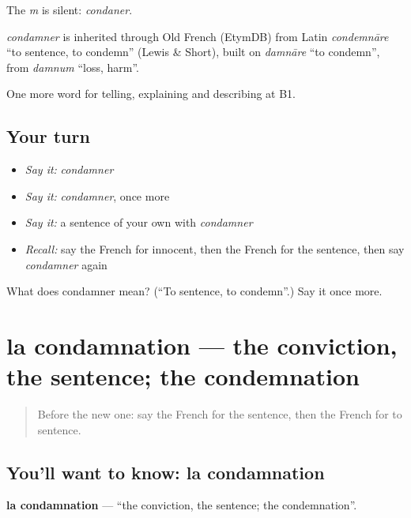 The \emph{m} is silent: \emph{condaner}.

\begin{cousinweb}
\emph{condamner} is inherited through Old French (EtymDB) from Latin \emph{condemnāre} \textquotedblleft{}to sentence, to condemn\textquotedblright{} (Lewis \& Short), built on \emph{damnāre} \textquotedblleft{}to condemn\textquotedblright{}, from \emph{damnum} \textquotedblleft{}loss, harm\textquotedblright{}.
\end{cousinweb}

\begin{grammarlens}[title={What you've built}]
One more word for telling, explaining and describing at B1.
\end{grammarlens}

\subsection*{Your turn}
\begin{itemize}
\raggedright
  \item \emph{Say it:} \emph{condamner}
  \item \emph{Say it:} \emph{condamner}, once more
  \item \emph{Say it:} a sentence of your own with \emph{condamner}
  \item \emph{Recall:} say the French for innocent, then the French for the sentence, then say \emph{condamner} again
\end{itemize}

\begin{tcolorbox}[breakable,colback=teal!4,colframe=teal!35!black,title={Before you move on}]
What does condamner mean? (\textquotedblleft{}To sentence, to condemn\textquotedblright{}.) Say it once more.
\end{tcolorbox}
\section[la condamnation]{la condamnation — the conviction, the sentence; the condemnation}

\label{lesson:FR-C388-condamnation}



\begin{quote}
Before the new one: say the French for the sentence, then the French for to sentence.
\end{quote}

\subsection*{You'll want to know: la condamnation}
\textbf{la condamnation} — \textquotedblleft{}the conviction, the sentence; the condemnation\textquotedblright{}.

